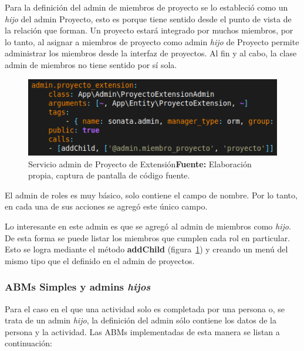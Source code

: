 Para la definición del admin de miembros de proyecto se lo estableció como un \textit{hijo} del admin Proyecto, esto es porque tiene sentido desde el punto
de vista de la relación que forman. Un proyecto estará integrado por muchos miembros, por lo tanto, al asignar a miembros de proyecto como admin \textit{hijo}
de Proyecto permite administrar los miembros desde la interfaz de proyectos. Al fin y al cabo, la clase admin de miembros no tiene sentido por sí sola.



\begin{figure}[h!]
    \includegraphics[width=1\linewidth]{image/addChild.png}
    \caption{Servicio admin de Proyecto de Extensión\newline \textbf{Fuente:} Elaboración propia, captura de pantalla de código fuente.}
    \label{fig:image/addChild}
\end{figure}

%

El admin de roles es muy básico, solo contiene el campo de nombre. Por lo tanto, en cada una de sus acciones se agregó este único campo.


Lo interesante en este admin es que se agregó al admin de miembros como \textit{hijo}. De esta forma se puede listar los miembros que cumplen cada rol en
particular.
Esto se logra mediante el método \textbf{addChild} (figura~\ref{fig:image/addChild}) y creando un menú del mismo tipo que el definido en el admin de proyectos.

\subsubsection{ABMs Simples y admins \textit{hijos}}%
\label{ssub:ambs_simples}

Para el caso en el que una actividad solo es completada por una persona o, se trata de un admin \textit{hijo}, la definición del admin sólo contiene los datos de la persona y la actividad\@. Las ABMs
implementadas de esta manera se listan a continuación:

\begin{itemize}
        
\end{itemize}

